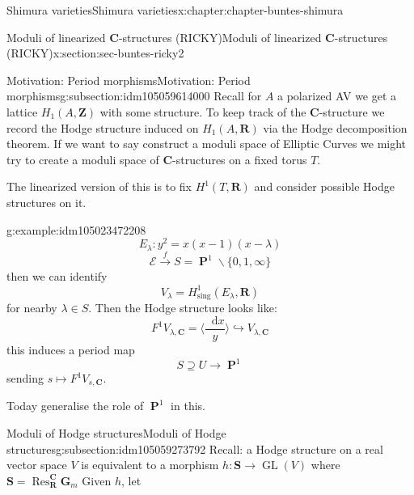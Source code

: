 \documentclass[oneside,10pt,]{book}
\numberwithin{equation}{section}
\newcommand{\diff}{\mathop{}\!\mathrm{d}}
\newcommand{\ZZ}{\mathbf{Z}}
\newcommand{\RR}{\mathbf{R}}
\newcommand{\CC}{\mathbf{C}}
\newcommand{\sing}{\mathrm{sing}}
\DeclareMathOperator{\Res}{Res}
\DeclareMathOperator{\PP}{\mathbf{P}}
\DeclareMathOperator{\GL}{GL}
\begin{document}
\begin{chapterptx}{Shimura varieties}{}{Shimura varieties}{}{}{x:chapter:chapter-buntes-shimura}
\begin{sectionptx}{Moduli of linearized \(\CC\)-structures (RICKY)}{}{Moduli of linearized \(\CC\)-structures (RICKY)}{}{}{x:section:sec-buntes-ricky2}
%
%
\typeout{************************************************}
\typeout{************************************************}
%
\begin{subsectionptx}{Motivation: Period morphisms}{}{Motivation: Period morphisms}{}{}{g:subsection:idm105059614000}
Recall for  \(A\) a  polarized AV we get a lattice \(H_1(A,\ZZ)\) with some structure. To keep track of the \(\CC\)-structure  we record the Hodge structure induced on \(H_1(A,\RR)\) via the Hodge decomposition theorem. If we want to say construct a moduli space of Elliptic Curves we might try to create a moduli space of \(\CC\)-structures on a fixed torus \(T\).%
\par
The linearized version of this is to fix \(H^1(T, \RR)\) and consider possible Hodge structures on it.%
\begin{example}{}{g:example:idm105023472208}%
%
\begin{equation*}
E_\lambda \colon y^2 = x(x-1) (x-\lambda)
\end{equation*}
%
\begin{equation*}
\mathcal E \xrightarrow f S = \PP^1 \smallsetminus \{0,1,\infty\}
\end{equation*}
then we can identify%
\begin{equation*}
V_\lambda = H^1_\sing(E_\lambda, \RR)
\end{equation*}
for nearby \(\lambda \in S\). Then the Hodge structure looks like:%
\begin{equation*}
F^1 V_{\lambda, \CC} = \langle \frac{\diff x}{y} \rangle \hookrightarrow V_{\lambda, \CC}
\end{equation*}
this induces a period map%
\begin{equation*}
S\supseteq U \to \PP^1
\end{equation*}
sending \(s \mapsto F^1V_{s, \CC}\).%
\end{example}
Today generalise the role of \(\PP^1\) in this.%
\end{subsectionptx}
%
%
\typeout{************************************************}
\typeout{************************************************}
%
\begin{subsectionptx}{Moduli of Hodge structures}{}{Moduli of Hodge structures}{}{}{g:subsection:idm105059273792}
Recall: a Hodge structure on a real vector space \(V\) is equivalent to a morphism \(h \colon \mathbf S \to \GL(V)\) where \(\mathbf S  = \Res_\RR^\CC \mathbf G_m\) Given \(h\), let%

\end{subsectionptx}
\end{sectionptx}
\end{chapterptx}
\end{document}
